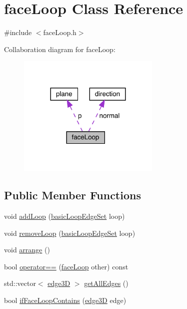 \hypertarget{classface_loop}{}\section{face\+Loop Class Reference}
\label{classface_loop}


{\ttfamily \#include $<$face\+Loop.\+h$>$}



Collaboration diagram for face\+Loop\+:
\nopagebreak
\begin{figure}[H]
\begin{center}
\leavevmode
\includegraphics[width=192pt]{classface_loop__coll__graph}
\end{center}
\end{figure}
\subsection*{Public Member Functions}
\begin{DoxyCompactItemize}
\item 
void \mbox{\hyperlink{classface_loop_ae948abd198e6e1496bd320d18b5d638b}{add\+Loop}} (\mbox{\hyperlink{classbasic_loop_edge_set}{basic\+Loop\+Edge\+Set}} loop)
\item 
void \mbox{\hyperlink{classface_loop_ac1c63792b00865fc45ad8934b5580e62}{remove\+Loop}} (\mbox{\hyperlink{classbasic_loop_edge_set}{basic\+Loop\+Edge\+Set}} loop)
\item 
void \mbox{\hyperlink{classface_loop_aa57ee2f9fd011ac4a8aa9b922998c34a}{arrange}} ()
\item 
bool \mbox{\hyperlink{classface_loop_a603c5cfde9765657af9cf088df8fc474}{operator==}} (\mbox{\hyperlink{classface_loop}{face\+Loop}} other) const
\item 
std\+::vector$<$ \mbox{\hyperlink{structedge3_d}{edge3D}} $>$ \mbox{\hyperlink{classface_loop_ad8ba004157748e073c1bc7527fda627c}{get\+All\+Edges}} ()
\item 
bool \mbox{\hyperlink{classface_loop_a3ed69fdb3554a255f484fa78fd1f3361}{if\+Face\+Loop\+Contains}} (\mbox{\hyperlink{structedge3_d}{edge3D}} edge)
\end{DoxyCompactItemize}
